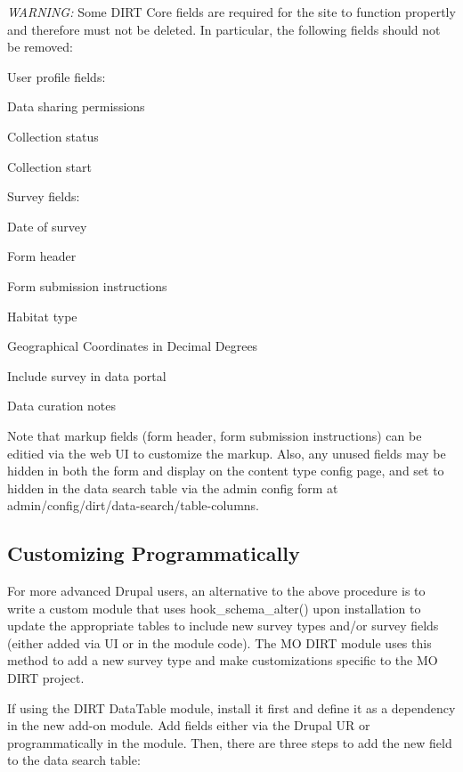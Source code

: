 {\itshape W\+A\+R\+N\+I\+NG\+:} Some D\+I\+RT Core fields are required for the site to function propertly and therefore must not be deleted. In particular, the following fields should not be removed\+:

User profile fields\+:
\begin{DoxyItemize}
\item Data sharing permissions
\item Collection status
\item Collection start
\end{DoxyItemize}

Survey fields\+:
\begin{DoxyItemize}
\item Date of survey
\item Form header
\item Form submission instructions
\item Habitat type
\item Geographical Coordinates in Decimal Degrees
\item Include survey in data portal
\item Data curation notes
\end{DoxyItemize}

Note that markup fields (form header, form submission instructions) can be editied via the web UI to customize the markup. Also, any unused fields may be hidden in both the form and display on the content type config page, and set to hidden in the data search table via the admin config form at admin/config/dirt/data-\/search/table-\/columns.

\subsection*{Customizing Programmatically}

For more advanced Drupal users, an alternative to the above procedure is to write a custom module that uses hook\+\_\+schema\+\_\+alter() upon installation to update the appropriate tables to include new survey types and/or survey fields (either added via UI or in the module code). The MO D\+I\+RT module uses this method to add a new survey type and make customizations specific to the MO D\+I\+RT project.

If using the D\+I\+RT Data\+Table module, install it first and define it as a dependency in the new add-\/on module. Add fields either via the Drupal UR or programmatically in the module. Then, there are three steps to add the new field to the data search table\+:


